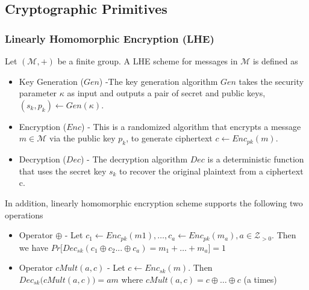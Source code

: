 \begin{comment}
\subsubsection{Computational Differential Privacy}
\begin{definition}
 (IND-CDP privacy) An ensemble $\{f_\kappa\}\kappa  \in N$ of randomized
functions $f_\kappa : D \rightarrow R_\kappa$ provides $(\epsilon,
\kappa)$-ind-cdp if there exists a negligible function $negl(\cdot)$ such that for every nonuniform p.p.t turing machine (“distinguisher”) $A$, every polynomial $p(\cdot)$, every sufficiently large $\kappa \in N$ all
data sets $D,D' \in \mathcal{D}$ of size at most $p(\kappa)$ such that $|D-D'|\leq  1$, and
every advice string $z_{\kappa}$ of size at most $p(\kappa)$, it holds that \begin{gather}
Pr [A_{\kappa}(f_{\kappa}(D)) = 1] \leq e^{\epsilon} \times Pr[A_{\kappa}(f_{\kappa}(D')) = 1]
+ negl(\kappa)\end{gather}
where we write $A_\kappa(x)$ for $A(1^{\kappa}, z_{\kappa}, x)$ and the probability is taken over
the randomness of mechanism $f_\kappa$ and adversary $A_\kappa$.
\end{definition}


\end{comment}
\subsection{Cryptographic Primitives}
\subsubsection{Linearly Homomorphic Encryption (\textsf{LHE})}
 Let $(\mathcal{M}, +)$ be a finite group. A \textsf{LHE} scheme 
for messages in $\mathcal{M}$ is defined as\begin{itemize}
\item Key Generation ($Gen$) -The key generation algorithm $Gen$ takes the security parameter $\kappa$ as input and outputs
a pair of secret and public keys, $(s_k, p_k) \leftarrow Gen(\kappa)$.
\item Encryption ($Enc$) - This is a randomized algorithm that encrypts a message $m \in \mathcal{M}$ via the public key $p_k$, to generate ciphertext $c \leftarrow Enc_{pk}(m)$.
\item Decryption ($Dec$) - The decryption algorithm $Dec$ is a deterministic function that uses the secret key $s_k$ to
recover the original plaintext from a ciphertext c.
\end{itemize}
In addition, linearly homomorphic encryption scheme supports the following two operations
\begin{itemize}\item Operator $\oplus$ - Let $c_1 \leftarrow Enc_{pk}(m1), \ldots, c_a \leftarrow Enc_{pk}(m_a), a \in \mathcal{Z}_{>0}$. Then we have  $Pr\big[Dec_{sk}(c_1\oplus c_2 ...\oplus c_a)=    m_1 + \ldots   + m_a\big]=1$  
\item Operator $cMult(a,c)$ - Let $c\leftarrow  Enc_{sk}(m)$. Then  \\ $Dec_{sk}\big(cMult(a,c)\big)=am$ where $cMult(a,c)=c\oplus \ldots \oplus c$ (a times) \end{itemize}
